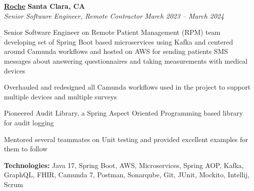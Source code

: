 %
    \headerrow
        {\textbf{\href{https://www.roche.com/}{Roche}}}
        {\textbf{Santa Clara, CA}}
    \\
    \headerrow
        {\emph{Senior Software Engineer, Remote Contractor}}
        {\emph{March 2023 -- March 2024}}
    \begin{itemize*}
        \item Senior Software Engineer on Remote Patient Management (RPM) team developing set of Spring Boot based microservices using Kafka and centered around Camunda workflows and hosted on AWS for sending patients SMS messages about answering questionnaires and taking measurements with medical devices
        \item Overhauled and redesigned all Camunda workflows used in the project to support multiple devices and multiple surveys
        \item Pioneered Audit Library, a Spring Aspect Oriented Programming based library for audit logging
        \item Mentored several teammates on Unit testing and provided excellent examples for them to follow
    \end{itemize*}

    \hspace{1.0em}
        {\textbf{Technologies:} Java 17, Spring Boot, AWS, Microservices, Spring AOP, Kafka, GraphQL, FHIR, Camunda 7, Postman, Sonarqube, Git, JUnit, Mockito, Intellij, Scrum}

